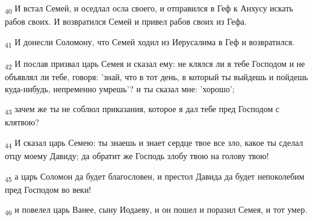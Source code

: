 \begin{tcolorbox}
\textsubscript{40} И встал Семей, и оседлал осла своего, и отправился в Геф к Анхусу искать рабов своих. И возвратился Семей и привел рабов своих из Гефа.
\end{tcolorbox}
\begin{tcolorbox}
\textsubscript{41} И донесли Соломону, что Семей ходил из Иерусалима в Геф и возвратился.
\end{tcolorbox}
\begin{tcolorbox}
\textsubscript{42} И послав призвал царь Семея и сказал ему: не клялся ли я тебе Господом и не объявлял ли тебе, говоря: 'знай, что в тот день, в который ты выйдешь и пойдешь куда-нибудь, непременно умрешь'? и ты сказал мне: 'хорошо';
\end{tcolorbox}
\begin{tcolorbox}
\textsubscript{43} зачем же ты не соблюл приказания, которое я дал тебе пред Господом с клятвою?
\end{tcolorbox}
\begin{tcolorbox}
\textsubscript{44} И сказал царь Семею: ты знаешь и знает сердце твое все зло, какое ты сделал отцу моему Давиду; да обратит же Господь злобу твою на голову твою!
\end{tcolorbox}
\begin{tcolorbox}
\textsubscript{45} а царь Соломон да будет благословен, и престол Давида да будет непоколебим пред Господом во веки!
\end{tcolorbox}
\begin{tcolorbox}
\textsubscript{46} и повелел царь Ванее, сыну Иодаеву, и он пошел и поразил Семея, и тот умер.
\end{tcolorbox}
